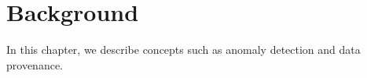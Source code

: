 \chapter{Background}

In this chapter, we describe concepts such as anomaly detection and data provenance. 



%
%
%
%

